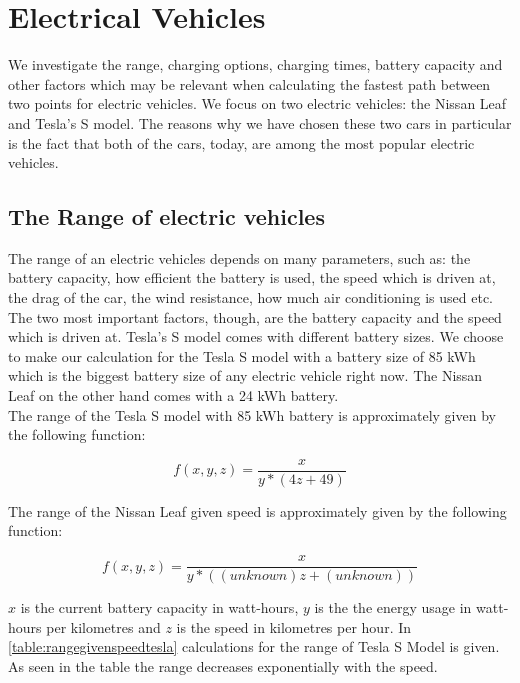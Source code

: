 
\section{Electrical Vehicles}

We investigate the range, charging options, charging times, battery capacity and other factors 
which may be relevant when calculating the fastest path between two points for electric vehicles.
We focus on two electric vehicles: the Nissan Leaf and Tesla's S model. The reasons why we have 
chosen these two cars in particular is the fact that both of the cars, today, are among the most 
popular electric vehicles. 

\subsection{The Range of electric vehicles}

The range of an electric vehicles depends on many parameters, such as: the battery capacity, how efficient the battery
is used, the speed which is driven at, the drag of the car, the wind resistance, how much air conditioning is 
used etc. The two most important factors, though, are the battery capacity and the speed which is driven at. 
Tesla's S model comes with different battery sizes. We choose to make our calculation for the Tesla S model with a 
battery size of 85 kWh which is the biggest battery size of any electric vehicle right now. The Nissan Leaf on the 
other hand comes with a 24 kWh battery.\\

The range of the Tesla S model with 85 kWh battery is approximately given by the following function:

\[f(x, y, z) = \frac{x}{y * (4z + 49)}\]

The range of the Nissan Leaf given speed is approximately given by the following function:

\[f(x, y, z) = \frac{x}{y * ((\textit{unknown})z + (\textit{unknown}))}\]

$x$ is the current battery capacity in watt-hours, $y$ is the the energy usage in watt-hours per kilometres and $z$ is the 
speed in kilometres per hour. In \ref{table:rangegivenspeedtesla} calculations for the range of Tesla S Model is given. 
As seen in the table the range decreases exponentially with the speed.\\


